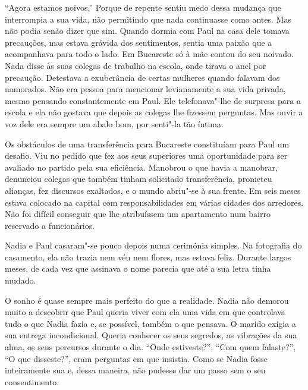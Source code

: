 ``Agora estamos noivos.'' Porque de repente sentiu medo dessa mudança que
interrompia a sua vida, não permitindo que nada continuasse como antes.
Mas não podia senão dizer que sim. Quando dormia com Paul na casa dele
tomava precauções, mas estava grávida dos sentimentos, sentia uma paixão
que a acompanhava para todo o lado. Em Bucareste só à mãe contou do seu
noivado. Nada disse às suas colegas de trabalho na escola, onde tirava o
anel por precaução. Detestava a exuberância de certas mulheres quando
falavam dos namorados. Não era pessoa para mencionar levianamente a sua
vida privada, mesmo pensando constantemente em Paul. Ele telefonava"-lhe
de surpresa para a escola e ela não gostava que depois as colegas lhe
fizessem perguntas. Mas ouvir a voz dele era
sempre um abalo bom, por senti"-la tão íntima.

Os obstáculos de uma transferência para Bucareste constituíam para Paul
um desafio. Viu no pedido que fez
aos seus superiores uma oportunidade para ser avaliado no partido pela
sua eficiência. Manobrou o que havia a manobrar, denunciou colegas que
também tinham solicitado transferência, prometeu alianças, fez
discursos exaltados, e o mundo abriu"-se à sua frente. Em seis meses
estava colocado na capital com responsabilidades em várias cidades dos
arredores. Não foi difícil conseguir que lhe atribuíssem um apartamento
num bairro reservado a funcionários.

Nadia e Paul casaram"-se pouco depois numa cerimónia simples. Na
fotografia do casamento, ela não trazia nem véu nem flores, mas estava
feliz. Durante largos meses, de cada vez que assinava o nome parecia que
até a sua letra tinha mudado.

O sonho é quase sempre mais perfeito do que a realidade. Nadia não
demorou muito a descobrir que Paul queria viver com ela uma vida em que
controlava tudo o que Nadia fazia e, se possível, também o que pensava.
O marido exigia a sua entrega incondicional. Queria conhecer os seus
segredos, as vibrações da sua alma, os seus percursos durante o dia.
``Onde estiveste?'', ``Com quem falaste?'', ``O que disseste?'', eram
perguntas em que insistia. Como se Nadia fosse inteiramente sua e,
dessa maneira, não pudesse dar um passo sem o seu consentimento.

